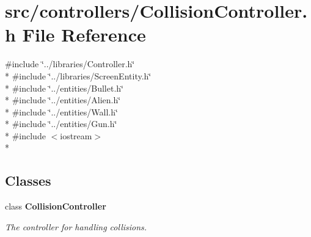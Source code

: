 \section{src/controllers/\-Collision\-Controller.h File Reference}
\label{_collision_controller_8h}
{\ttfamily \#include \char`\"{}../libraries/\-Controller.\-h\char`\"{}}\\*
{\ttfamily \#include \char`\"{}../libraries/\-Screen\-Entity.\-h\char`\"{}}\\*
{\ttfamily \#include \char`\"{}../entities/\-Bullet.\-h\char`\"{}}\\*
{\ttfamily \#include \char`\"{}../entities/\-Alien.\-h\char`\"{}}\\*
{\ttfamily \#include \char`\"{}../entities/\-Wall.\-h\char`\"{}}\\*
{\ttfamily \#include \char`\"{}../entities/\-Gun.\-h\char`\"{}}\\*
{\ttfamily \#include $<$iostream$>$}\\*
\subsection*{Classes}
\begin{DoxyCompactItemize}
\item 
class {\bf Collision\-Controller}
\begin{DoxyCompactList}\small\item\em The controller for handling collisions. \end{DoxyCompactList}\end{DoxyCompactItemize}
